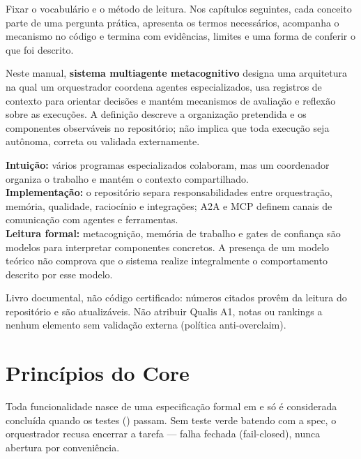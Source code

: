 \begin{funcao}
Fixar o vocabulário e o método de leitura. Nos capítulos seguintes, cada conceito
parte de uma pergunta prática, apresenta os termos necessários, acompanha o
mecanismo no código e termina com evidências, limites e uma forma de conferir o
que foi descrito.
\end{funcao}

\begin{definicao}
Neste manual, \textbf{sistema multiagente metacognitivo} designa uma arquitetura
na qual um orquestrador coordena agentes especializados, usa registros de contexto
para orientar decisões e mantém mecanismos de avaliação e reflexão sobre as
execuções. A definição descreve a organização pretendida e os componentes
observáveis no repositório; não implica que toda execução seja autônoma, correta ou
validada externamente.
\end{definicao}

\begin{niveis}
\textbf{Intuição:} vários programas especializados colaboram, mas um coordenador
organiza o trabalho e mantém o contexto compartilhado.\\
\textbf{Implementação:} o repositório separa responsabilidades entre orquestração,
memória, qualidade, raciocínio e integrações; A2A e MCP definem canais de
comunicação com agentes e ferramentas.\\
\textbf{Leitura formal:} metacognição, memória de trabalho e gates de confiança são
modelos para interpretar componentes concretos. A presença de um modelo teórico
não comprova que o sistema realize integralmente o comportamento descrito por
esse modelo.
\end{niveis}

\begin{limite}
Livro documental, não código certificado: números citados provêm da leitura do
repositório e são atualizáveis. Não atribuir Qualis A1, notas ou rankings a nenhum
elemento sem validação externa (política anti-overclaim).
\end{limite}

\clearpage
\section{Princípios do Core}


\begin{conceito}
Toda funcionalidade nasce de uma especificação formal em 
e só é considerada concluída quando os testes () passam. Sem
teste verde batendo com a spec, o orquestrador recusa encerrar a tarefa — falha
fechada (fail-closed), nunca abertura por conveniência.
\end{conceito}

